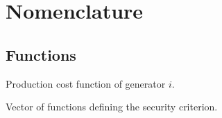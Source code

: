 \section*{Nomenclature}

\subsection{Functions}
\begin{description}

\item[$C^{P}_{i}(\cdot)$] Production cost function of generator $i$.

\item[${\boldsymbol{f}}(\cdot)$] Vector of functions defining the security criterion.

\end{description}

